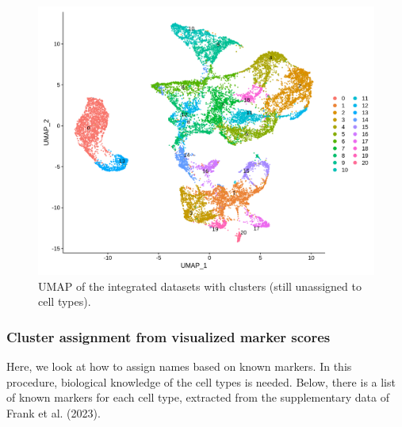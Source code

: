 \documentclass[
  letterpaper,
  DIV=11,
  numbers=noendperiod]{scrartcl}
\begin{document}
\begin{figure}[H]

{\centering \includegraphics{notebook_files/figure-pdf/fig-umapleiden-output-1.png}

}

\caption{\label{fig-umapleiden}UMAP of the integrated datasets with
clusters (still unassigned to cell types).}

\end{figure}

\hypertarget{cluster-assignment-from-visualized-marker-scores}{%
\subsubsection{Cluster assignment from visualized marker
scores}\label{cluster-assignment-from-visualized-marker-scores}}

Here, we look at how to assign names based on known markers. In this
procedure, biological knowledge of the cell types is needed. Below,
there is a list of known markers for each cell type, extracted from the
supplementary data of Frank et al. (2023).
\end{document}
